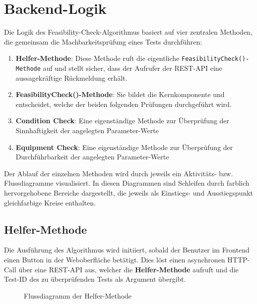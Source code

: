 \section{Backend-Logik}\label{Sec:Backend-Logik}

Die Logik des Feasibility-Check-Algorithmus basiert auf vier zentralen Methoden, die gemeinsam die Machbarkeitsprüfung eines Tests durchführen:  

\begin{enumerate}
    \item \textbf{Helfer-Methode}: Diese Methode ruft die eigentliche \texttt{FeasibilityCheck()-Methode} auf und stellt sicher, dass der Aufrufer der REST-API eine aussagekräftige Rückmeldung erhält.  
    \item \textbf{FeasibilityCheck()-Methode}: Sie bildet die Kernkomponente und entscheidet, welche der beiden folgenden Prüfungen durchgeführt wird.  
    \item \textbf{Condition Check}: Eine eigenständige Methode zur Überprüfung der Sinnhaftigkeit der angelegten Parameter-Werte
    \item \textbf{Equipment Check}: Eine eigenständige Methode zur Überprüfung der Durchführbarkeit der angelegten Parameter-Werte
\end{enumerate}  

Der Ablauf der einzelnen Methoden wird durch jeweils ein Aktivitäts- bzw. Flussdiagramme visualisiert. In diesen Diagrammen sind Schleifen durch farblich hervorgehobene Bereiche dargestellt, die jeweils als Einstiegs- und Ausstiegspunkt gleichfarbige Kreise enthalten.


\subsection{Helfer-Methode}

Die Ausführung des Algorithmus wird initiiert, sobald der Benutzer im Frontend einen Button in der Weboberfläche betätigt. Dies löst einen asynchronen HTTP-Call über eine REST-API aus, welcher die \textbf{Helfer-Methode} aufruft und die Test-ID des zu überprüfenden Tests als Argument übergibt.

\begin{figure}[!htbp]
    \centering
    \caption{Flussdiagramm der Helfer-Methode}
    \label{fig:feasibility-http-call-method}
\end{figure}

